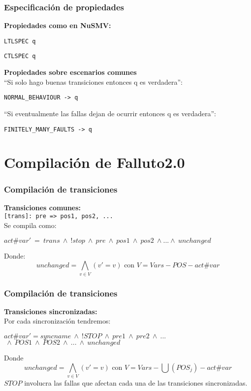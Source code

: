 \documentclass[serif]{beamer}
\begin{document}
\begin{frame}
\frametitle{Especificación de propiedades}
\textbf{Propiedades como en NuSMV:}\\[0.3cm]
\begin{center}\texttt{LTLSPEC q}

\texttt{CTLSPEC q}\end{center}
\textbf{Propiedades sobre escenarios comunes}\\[0.3cm]
``Si solo hago buenas transiciones entonces q es verdadera'':\\[0.2cm]
\begin{center} \texttt{NORMAL\_BEHAVIOUR -> q}\end{center}
``Si eventualmente las fallas dejan de ocurrir entonces q es
verdadera'':\\[0.2cm]
\begin{center} \texttt{FINITELY\_MANY\_FAULTS -> q}\end{center}
\end{frame}


\section[Compilaci\'on]{Compilación de Falluto2.0}


\begin{frame}
\frametitle{Compilación de transiciones}
\textbf{\Large Transiciones comunes:}\\[0.3cm]
\texttt{[trans]: pre => pos1, pos2, ...}\\[0.3cm]
Se compila como:
\begin{framed}
$act\#var'~=~trans~\wedge~!stop~\wedge~pre~\wedge~pos1~\wedge~pos2~\wedge...\wedge~unchanged$
\end{framed}
Donde:
$$unchanged = \bigwedge_{v\in V}(v' = v) \text{ con }V = Vars - POS - act\#var$$

\end{frame}


\begin{frame}
\frametitle{Compilación de transiciones}
\textbf{\Large Transiciones sincronizadas:}\\[0.3cm]
Por cada sincronizaci\'on tendremos:
\begin{framed}
$act\#var' = syncname~\wedge~!STOP~\wedge~pre1~\wedge~pre2~\wedge~...$
$~\wedge~POS1~\wedge~POS2~\wedge~...~\wedge~unchanged$\\[0.3cm]
\end{framed}
Donde
$$unchanged = \bigwedge_{v \in V}(v' = v) \text{ con }V = Vars 
- \bigcup (POS_j) - act\#var$$
$STOP$ involucra las fallas que afectan cada una de las 
transiciones sincronizadas.
\end{frame}
\end{document}
